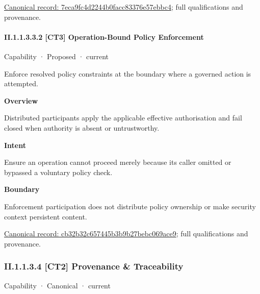 {\footnotesize \href{../../../../continuum/strategy/capability/7eca9fc4d2244b0facc83376e57ebbc4.md}{Canonical record: 7eca9fc4d2244b0facc83376e57ebbc4}; full qualifications and provenance.}\par
\paragraph*{II.1.1.3.3.2 [CT3] Operation-Bound Policy Enforcement}
\label{navigation:II.1.1.3.3.2}

\label{element:cb32b32c657445b3b9b27bebc069ace9}
{\small Capability · Proposed · current}\par

Enforce resolved policy constraints at the boundary where a governed action is attempted.



\textbf{Overview}



Distributed participants apply the applicable effective authorisation and fail closed when authority is absent or untrustworthy.



\textbf{Intent}



Ensure an operation cannot proceed merely because its caller omitted or bypassed a voluntary policy check.



\textbf{Boundary}



Enforcement participation does not distribute policy ownership or make security context persistent content.


{\footnotesize \href{../../../../continuum/strategy/capability/cb32b32c657445b3b9b27bebc069ace9.md}{Canonical record: cb32b32c657445b3b9b27bebc069ace9}; full qualifications and provenance.}\par
\subsubsection*{II.1.1.3.4 [CT2] Provenance \& Traceability}
\label{navigation:II.1.1.3.4}

\label{element:68a0755aa4e14a509ac5e6c0bbcff3e7}
{\small Capability · Canonical · current}\par

